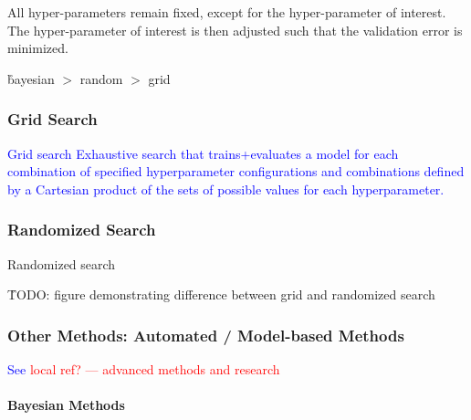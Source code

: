 All hyper-parameters remain fixed, except for the hyper-parameter of interest. The hyper-parameter of interest is then adjusted such that the validation error is minimized.

\r{bayesian $>$ random $>$ grid}

\subsubsection{Grid Search}

\textcolor{blue}{{Grid search} Exhaustive search that trains+evaluates a model for each combination of specified hyperparameter configurations and combinations defined by a Cartesian product of the sets of possible values for each hyperparameter.}

\subsubsection{Randomized Search}

\r{{Randomized search} }

\r{TODO: figure demonstrating difference between grid and randomized search}


\subsubsection{Other Methods: Automated / Model-based Methods}

\textcolor{blue}{See \textcolor{red}{local ref? --- advanced methods and research}}

\paragraph{Bayesian Methods}



